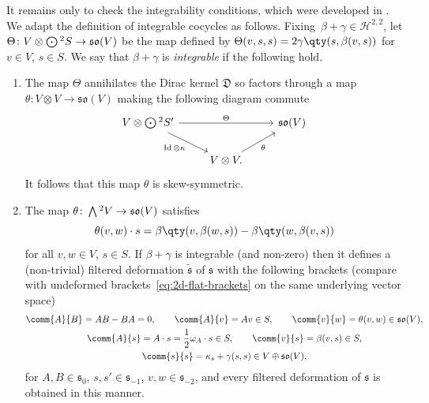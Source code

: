 \documentclass[10pt,a4paper]{amsart}
\numberwithin{equation}{section}
\newcommand{\fs}{\mathfrak{s}}
\newcommand{\fso}{\mathfrak{so}}
\newcommand{\fD}{\mathfrak{D}}
\newcommand{\cH}{\mathcal{H}}
\newcommand{\fstilde}{\widetilde{\fs}}
\newcommand{\Wedge}{\mathchoice{{\textstyle\bigwedge}}{\bigwedge}{\bigwedge}{\bigwedge}}	%
\newcommand{\Odot}{\mathchoice{{\textstyle\bigodot}}{\bigodot}{\bigodot}{\bigodot}}
\newcommand{\1}{\mathbbm{1}}
\DeclareMathOperator{\Id}{Id}
\begin{document}
It remains only to check the integrability conditions, which were developed in \cite[Section~4.4.2]{Beckett2024_2}. We adapt the definition of integrable cocycles \cite[Definition~4.23]{Beckett2024_2} as follows. Fixing~${\beta+\gamma\in\cH^{2,2}}$, let $\Theta\colon V\otimes\Odot^2S\to\fso(V) $ be the map defined by
$\Theta(v,s,s) = 2\gamma\qty(s,\beta(v,s))
$
for~${v\in V}$, $s\in S$. We say that $\beta+\gamma$ is \emph{integrable} if the following hold.
\begin{enumerate}\itemsep=0pt
	\item The map $\Theta$ annihilates the Dirac kernel $\fD$ so factors through a map $\theta\colon V\otimes V\to\fso(V)$ making the following diagram commute
	\[%
	\begin{tikzcd}
		V\otimes \Odot^2 S' \ar[rr,"\Theta"]\ar[rd,"\Id\otimes \kappa"'] & & \fso(V)\\
			& V \otimes V \ar[ru,"\theta"']. &
	\end{tikzcd}
	\]
	It follows that this map $\theta$ is skew-symmetric.
	\item The map $\theta\colon \Wedge^2 V\to \fso(V)$ satisfies
	\[%
		\theta(v,w)\cdot s
		= \beta\qty(v,\beta(w,s)) - \beta\qty(w,\beta(v,s))
	\]
	for all $v,w\in V$, $s\in S$.
If $\beta+\gamma$ is integrable (and non-zero) then it defines a (non-trivial) filtered deformation $\fstilde$ of $\fs$ with the following brackets (compare with undeformed brackets~\eqref{eq:2d-flat-brackets} on the same underlying vector space)
\begin{gather}
		\comm{A}{B} = AB-BA=0,\qquad
		 \comm{A}{v} = Av \in S,\qquad
		\comm{v}{w} = \theta(v,w) \in\fso(V),\nonumber	\\
		\comm{A}{s} = A\cdot s=\frac{1}{2}\omega_A\cdot s \in S,\qquad
		 \comm{v}{s} = \beta(v,s) \in S,\nonumber\\
		 \comm{s}{s}= \kappa_s + \gamma(s,s) \in V\oplus\fso(V),\label{eq:2d-deformed-brackets}
\end{gather}
for $A,B\in\fs_0$, $s,s'\in\fs_{-1}$, $v,w\in\fs_{-2}$, and every filtered deformation of $\fs$ is obtained in this manner.
	\end{enumerate}
\end{document}
